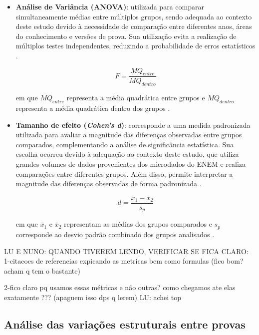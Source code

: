 \documentclass[a4paper,10pt, twocolumn]{article}
\begin{document}
\begin{itemize}

\item \textbf{Análise de Variância (ANOVA)}: utilizada para comparar simultaneamente médias entre múltiplos grupos, sendo adequada ao contexto deste estudo devido à necessidade de comparação entre diferentes anos, áreas do conhecimento e versões de prova. Sua utilização evita a realização de múltiplos testes independentes, reduzindo a probabilidade de erros estatísticos \cite{field2018discovering}.

\begin{equation}
F=
\frac{MQ_{entre}}
{MQ_{dentro}}
\end{equation}

em que $MQ_{entre}$ representa a média quadrática entre grupos e $MQ_{dentro}$ representa a média quadrática dentro dos grupos \cite{libretexts_anova}.

\item \textbf{Tamanho de efeito (\textit{Cohen's d})}: corresponde a uma medida padronizada utilizada para avaliar a magnitude das diferenças observadas entre grupos comparados, complementando a análise de significância estatística. Sua escolha ocorreu devido à adequação ao contexto deste estudo, que utiliza grandes volumes de dados provenientes dos microdados do ENEM e realiza comparações entre diferentes grupos. Além disso, permite interpretar a magnitude das diferenças observadas de forma padronizada \cite{cohen1988statistical}.

\begin{equation}
d=
\frac{\bar{x}_1-\bar{x}_2}
{s_p}
\end{equation}

em que $\bar{x}_1$ e $\bar{x}_2$ representam as médias dos grupos comparados e $s_p$ corresponde ao desvio padrão combinado dos grupos analisados \cite{jim_cohensd}.

\end{itemize}

LU E NUNO: QUANDO TIVEREM LENDO, VERIFICAR SE FICA CLARO: 
1-citacoes de referencias expicando as metricas bem como formulas (fico bom?acham q tem o bastante)

2-fico claro pq usamos essas métricas e não outras? como chegamos ate elas exatamente ??? (apaguem isso dps q lerem)
LU: achei top

\subsection{Análise das variações estruturais entre provas} 
\end{document}
